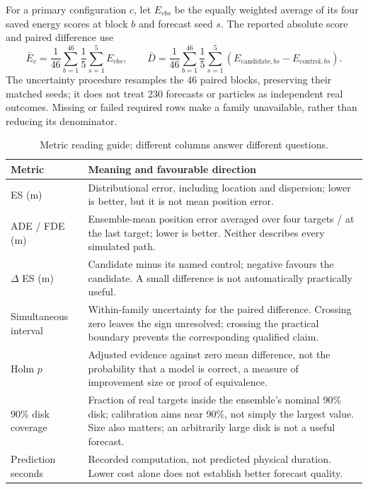 \documentclass[11pt]{article}
\begin{document}
For a primary configuration $c$, let $E_{cbs}$ be the equally weighted
average of its four saved energy scores at block $b$ and forecast seed $s$.
The reported absolute score and paired difference use
\begin{equation}
\bar E_c=\frac{1}{46}\sum_{b=1}^{46}\frac{1}{5}\sum_{s=1}^{5}E_{cbs},
\qquad
\bar D=\frac{1}{46}\sum_{b=1}^{46}\frac{1}{5}\sum_{s=1}^{5}
(E_{\mathrm{candidate},bs}-E_{\mathrm{control},bs}).
\label{eq:primary-aggregation}
\end{equation}
The uncertainty procedure resamples the 46 paired blocks, preserving their
matched seeds; it does not treat 230 forecasts or particles as independent
real outcomes. Missing or failed required rows make a family unavailable,
rather than reducing its denominator.

\begin{table}[htbp]
\centering\small
\caption{Metric reading guide; different columns answer different questions.}
\label{tab:metric-reader}
\begin{tabular}{@{}p{.22\linewidth}p{.69\linewidth}@{}}
\toprule
Metric & Meaning and favourable direction\\
\midrule
ES (m) & Distributional error, including location and dispersion; lower is better,
but it is not mean position error.\\
ADE / FDE (m) & Ensemble-mean position error averaged over four targets / at the last
target; lower is better. Neither describes every simulated path.\\
$\Delta$ ES (m) & Candidate minus its named control; negative favours the candidate.
A small difference is not automatically practically useful.\\
Simultaneous interval & Within-family uncertainty for the paired difference.
Crossing zero leaves the sign unresolved; crossing the practical boundary
prevents the corresponding qualified claim.\\
Holm $p$ & Adjusted evidence against zero mean difference, not the probability that
a model is correct, a measure of improvement size or proof of equivalence.\\
90\% disk coverage & Fraction of real targets inside the ensemble's nominal 90\%
disk; calibration aims near 90\%, not simply the largest value. Size also
matters; an arbitrarily large disk is not a useful forecast.\\
Prediction seconds & Recorded computation, not predicted physical duration.
Lower cost alone does not establish better forecast quality.\\
\bottomrule
\end{tabular}
\end{table}
\end{document}

